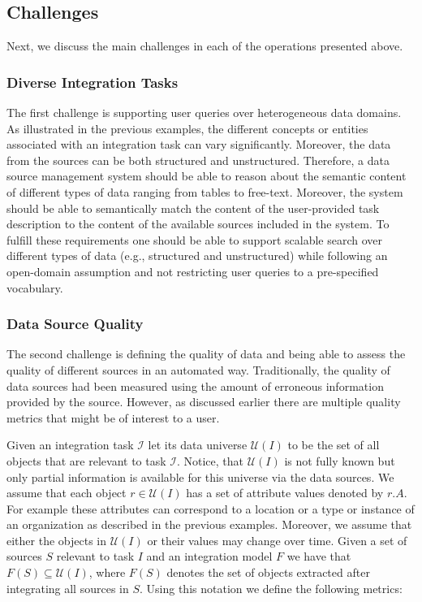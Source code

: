 \documentclass{sig-alternate}
\begin{document}
\subsection{Challenges}
Next, we discuss the main challenges in each of the operations presented above. 
\subsubsection{Diverse Integration Tasks}
\label{sec:diverse}
The first challenge is supporting user queries over heterogeneous data domains. As illustrated in the previous examples, the different concepts or entities associated with an integration task can vary significantly. Moreover, the data from the sources can be both structured and unstructured. Therefore, a data source management system should be able to reason about the semantic content of different types of data ranging from tables to free-text. Moreover, the system should be able to semantically match the content of the user-provided task description to the content of the available sources included in the system. To fulfill these requirements one should be able to support scalable search over different types of data (e.g., structured and unstructured) while following an open-domain assumption and not restricting user queries to a pre-specified vocabulary.

\subsubsection{Data Source Quality} 
\label{sec:quality}
The second challenge is defining the quality of data and being able to assess the quality of different sources in an automated way. Traditionally, the quality of data sources had been measured using the amount of erroneous information provided by the source. However, as discussed earlier there are multiple quality metrics that might be of interest to a user. 

Given an integration task $\mathcal{I}$ let its data universe $\mathcal{U}(I)$ to be the set of all objects that are relevant to task $\mathcal{I}$. Notice, that $\mathcal{U}(I)$ is not fully known but only partial information is available for this universe via the data sources. We assume that each object $r \in \mathcal{U}(I)$ has a set of attribute values denoted by $r.A$. For example these attributes can correspond to a location or a type or instance of an organization as described in the previous examples. Moreover, we assume that either the objects in $\mathcal{U}(I)$ or their values may change over time. Given a set of sources $S$ relevant to task $I$ and an integration model $F$ we have that $F(S) \subseteq \mathcal{U}(I)$, where $F(S)$ denotes the set of objects extracted after integrating all sources in $S$. Using this notation we define the following metrics:
\end{document}
